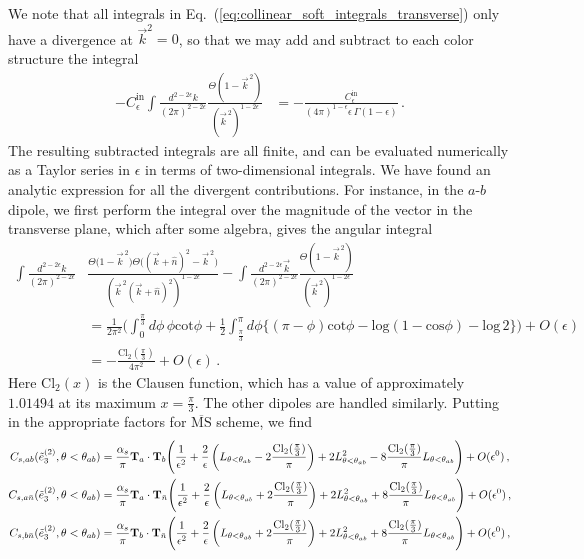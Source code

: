 \documentclass[a4paper,11pt]{article}
\newcommand{\nbar}{{\bar n}}
\newcommand{\ecflp}[2]{\tilde e_{#1}^{(#2)}}
\def\log{\text{log}}
\newcommand{\nn}{\nonumber}
\def\nbar{\bar n}
\DeclareRobustCommand{\Eq}[1]{Eq.~(\ref{#1})}
\begin{document}
We note that all integrals in \Eq{eq:collinear_soft_integrals_transverse} only have a divergence at $\vec{k}^2=0$, so that we may add and subtract to each color structure the integral
\begin{align}\label{eq:collinear_soft_subtraction}
-C_{\epsilon}^{\text{in}}\int\frac{d^{2-2\epsilon}{k}}{(2\pi)^{2-2\epsilon}}\frac{\Theta\left(1-\vec{k}^{\,2}\right)}{(\vec{k}^{\,2})^{1-2\epsilon}}&=-\frac{C_{\epsilon}^{\text{in}}}{(4\pi)^{1-\epsilon}\epsilon\,\Gamma(1-\epsilon)}\,.
\end{align}
The resulting subtracted integrals are all finite, and can be evaluated numerically as a Taylor series in $\epsilon$ in terms of two-dimensional integrals. We have found an analytic expression for all the divergent contributions. For instance, in the $a$-$b$ dipole, we first perform the integral over the magnitude of the vector in the transverse plane, which after some algebra, gives the angular integral
{\small\begin{align}
\int\frac{d^{2-2\epsilon}{k}}{(2\pi)^{2-2\epsilon}}&\frac{\Theta\Big(1-\vec{k}^{\,2}\Big)\Theta\Big((\vec{k}+\hat{n})^2-\vec{k}^{\,2}\Big)}{(\vec{k}^{\,2}(\vec{k}+\hat{n})^2)^{1-2\epsilon}}-\int\frac{d^{2-2\epsilon}\vec{k}}{(2\pi)^{2-2\epsilon}}\frac{\Theta\left(1-\vec{k}^{\,2}\right)}{(\vec{k}^{\,2})^{1-2\epsilon}}\nonumber\\
&=\frac{1}{2\pi^2}\Bigg(\int_{0}^{\frac{\pi}{3}}d\phi\,\phi\text{cot}\phi+\frac{1}{2}\int_{\frac{\pi}{3}}^{\pi}d\phi\Big\{(\pi-\phi)\text{cot}\phi-\log(1-\text{cos}\phi)-\log\,2\Big\}\Bigg)+O(\epsilon) \nn \\
&=-\frac{\text{Cl}_2(\frac{\pi}{3})}{4\pi^2}+O(\epsilon)\,.
\end{align}}
Here $\text{Cl}_2(x)$ is the Clausen function, which has a value of approximately $1.01494$ at its maximum $x=\frac{\pi}{3}$. The other dipoles are handled similarly. Putting in the appropriate factors for $\overline{\text{MS}}$ scheme, we find
{\small\begin{align}
C_{s, ab}(\ecflp{3}{2},\theta<\theta_{ab}) &= \frac{\alpha_s}{\pi}{\bf T}_a\cdot {\bf T}_b\Bigg(\frac{1}{\epsilon^2}+\frac{2}{\epsilon}\left(L_{\theta<\theta_{ab}}-2\frac{\text{Cl}_2(\frac{\pi}{3})}{\pi}\right)+2L_{\theta<\theta_{ab}}^2-8\frac{\text{Cl}_2(\frac{\pi}{3})}{\pi}L_{\theta<\theta_{ab}}\Bigg)+O(\epsilon^0) \,,\nonumber\\
C_{s, a\nbar}(\ecflp{3}{2},\theta<\theta_{ab}) &= \frac{\alpha_s}{\pi}{\bf T}_a\cdot {\bf T}_{\nbar}\Bigg(\frac{1}{\epsilon^2}+\frac{2}{\epsilon}\left(L_{\theta<\theta_{ab}}+2\frac{\text{Cl}_2(\frac{\pi}{3})}{\pi}\right)+2L_{\theta<\theta_{ab}}^2+8\frac{\text{Cl}_2(\frac{\pi}{3})}{\pi}L_{\theta<\theta_{ab}}\Bigg)+O(\epsilon^0)\,,\nonumber\\
C_{s, b\nbar}(\ecflp{3}{2},\theta<\theta_{ab}) &= \frac{\alpha_s}{\pi}{\bf T}_b\cdot {\bf T}_{\nbar}\Bigg(\frac{1}{\epsilon^2}+\frac{2}{\epsilon}\left(L_{\theta<\theta_{ab}}+2\frac{\text{Cl}_2(\frac{\pi}{3})}{\pi}\right)+2L_{\theta<\theta_{ab}}^2+8\frac{\text{Cl}_2(\frac{\pi}{3})}{\pi}L_{\theta<\theta_{ab}}\Bigg)+O(\epsilon^0)\,,
\end{align}}
\end{document}

